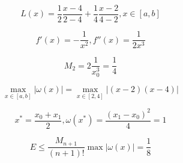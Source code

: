 \documentclass[10pt,a4paper]{article}
\begin{document}
		 \begin{equation}
		 	L\left(x\right) = \frac{1}{2}\frac{x - 4}{2 - 4} + 
		 	\frac{1}{4}\frac{x - 2}{4 - 2}, x \in \left[a, b\right]
		 \end{equation}
		 
		 \begin{equation}
		 	f'\left(x\right) = -\frac{1}{x^{2}}, f''\left(x\right) = 
		 	\frac{1}{2x^{3}}
		 \end{equation}
		 
		 \begin{equation}
		 	M_{2} = 2\frac{1}{x_{0}^{3}} = \frac{1}{4}
		 \end{equation}
		 
		 \begin{equation}
		 	\max\limits_{x \in \left[a, b\right]} \left|\omega\left(x
		 	\right)\right| = \max\limits_{x \in \left[2, 4\right]} 
		 	\left|\left(x - 2\right)\left(x - 4\right)\right|
		 \end{equation}
		 
		 \begin{equation}
		 	x^{*} = \frac{x_{0} + x_{1}}{2}, \omega\left(x^{*}\right) = 
			\frac{\left(x_{1} - x_{0}\right)^{2}}{4} = 1		 
		 \end{equation}
		 
		 \begin{equation}
		 	E\leqslant \frac{M_{n + 1}}{\left(n + 1\right)!}\max 
		 	\left|\omega\left(x\right)\right| = \frac{1}{8}
		 \end{equation}
	
\end{document}
